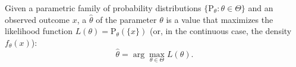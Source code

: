Given a parametric family of probability distributions $\{\text{P}_\theta : \theta \in \Theta\}$ and an observed outcome $x$, a  $\hat{\theta}$ of the parameter $\theta$ is a value that maximizes the likelihood function $L(\theta) = \text{P}_\theta(\{x\})$ (or, in the continuous case, the density $f_\theta(x)$):
$$\hat{\theta} = \arg\max_{\theta \in \Theta} L(\theta).$$
